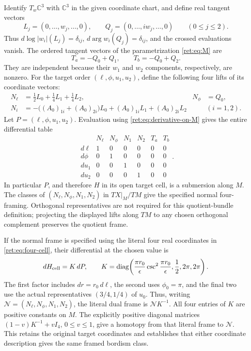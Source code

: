 \documentclass[11pt,letterpaper]{article}
\numberwithin{equation}{section}
\theoremstyle{definition}
\theoremstyle{remark}
\begin{document}
Identify \(T_w\mathbb C^3\) with \(\mathbb C^3\) in the given coordinate chart,
and define real tangent vectors
\begin{equation}
 L_j=(0,\ldots,w_j,\ldots,0),\qquad
 Q_j=(0,\ldots,iw_j,\ldots,0)\qquad(0\leq j\leq2).
 \label{ret:eq:LQ}
\end{equation}
Thus \(d\log|w_i|(L_j)=\delta_{ij}\),
\(d\arg w_i(Q_j)=\delta_{ij}\), and the crossed evaluations vanish.
The ordered tangent vectors of the parametrization \eqref{ret:eq:M} are
\begin{equation}
 T_a=-Q_0+Q_1,\qquad T_b=-Q_0+Q_2.
 \label{ret:eq:tangents}
\end{equation}
They are independent because their \(w_1\) and \(w_2\) components,
respectively, are nonzero.  For the target order
\((\ell,\phi,u_1,u_2)\), define the following four lifts of its
coordinate vectors:
\begin{align}
 N_\ell&=\tfrac12L_0+\tfrac14L_1+\tfrac14L_2,
       &N_\phi&=Q_0,\label{ret:eq:normal-first}\\
 N_i&=-\bigl((A_0)_{1i}+(A_0)_{2i}\bigr)L_0
           +(A_0)_{1i}L_1+(A_0)_{2i}L_2
       &&(i=1,2).\label{ret:eq:normal-u}
\end{align}
Let \(P=(\ell,\phi,u_1,u_2)\).  Evaluation using
\eqref{ret:eq:derivative-on-M} gives the entire differential table
\begin{equation}
\begin{array}{c|rrrrrr}
 &N_\ell&N_\phi&N_1&N_2&T_a&T_b\\\hline
 d\ell&1&0&0&0&0&0\\
 d\phi&0&1&0&0&0&0\\
 du_1&0&0&1&0&0&0\\
 du_2&0&0&0&1&0&0
\end{array}.
 \label{ret:eq:differential-table}
\end{equation}
In particular \(P\), and therefore \(H\) in its open target cell,
is a submersion along \(M\).  The classes of
\((N_\ell,N_\phi,N_1,N_2)\) in \(TX|_M/TM\) give the specified
normal four-framing.  Orthogonal representatives are not required for
this quotient-bundle definition; projecting the displayed lifts along
\(TM\) to any chosen orthogonal complement preserves the quotient
frame.

If the normal frame is specified using the literal four real coordinates
in \eqref{ret:eq:four-cell}, their differential at the chosen value is
\[
 dH_{\rm cell}=K\,dP,\qquad
 K=\operatorname{diag}\!\left(
 \frac{\pi r_0}{\epsilon}\csc^2\frac{\pi r_0}{\epsilon},
 \frac12,2\pi,2\pi\right).
\]
The first factor includes \(dr=r_0\,d\ell\), the second uses
\(\phi_0=\pi\), and the final two use the actual representatives
\((3/4,1/4)\) of \(u_0\). Thus, writing
\(\mathcal N=(N_\ell,N_\phi,N_1,N_2)\), the literal dual frame is
\(\mathcal N K^{-1}\). All four entries of \(K\) are positive
constants on \(M\). The explicitly positive diagonal matrices
\((1-v)K^{-1}+vI_4\), \(0\leq v\leq1\), give a homotopy
from that literal frame to \(\mathcal N\). This retains the original
target coordinates and establishes that either coordinate description
gives the same framed bordism class.
\end{document}
